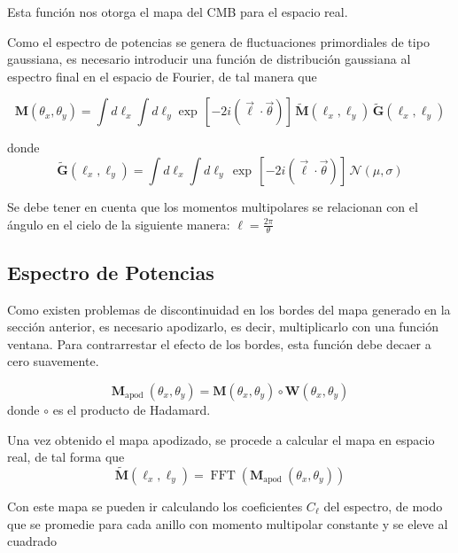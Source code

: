 \documentclass[twocolumn,letterpaper,spanish]{revtex4}
\numberwithin{equation}{section}
\begin{document}
Esta funci\'on nos otorga el mapa del CMB para el espacio real.

Como el espectro de potencias se genera de fluctuaciones primordiales de tipo gaussiana, es necesario introducir una funci\'on de distribuci\'on gaussiana al espectro final en el espacio de Fourier, de tal manera que

\begin{equation}
\mathbf{M}\left(\theta_{x}, \theta_{y}\right)=\int d \ell_{x} \int d \ell_{y} \exp \,[-2 i(\vec{\ell} \cdot \vec{\theta})] \,\tilde{\mathbf{M}}\left(\ell_{x}, \ell_{y}\right)\, \tilde{\mathbf{G}}\left(\ell_{x}, \ell_{y}\right)
\end{equation}

donde 
\begin{equation}
\tilde{\mathbf{G}}\left(\ell_{x}, \ell_{y}\right)=\int d \ell_{x} \int d \ell_{y} \,\exp\, [-2 i(\vec{\ell} \cdot \vec{\theta})] \,\mathcal{N}(\mu, \sigma)
\end{equation}

Se debe tener en cuenta que los momentos multipolares se relacionan con el \'angulo en el cielo de la siguiente manera: $\ell=\frac{2\pi}{\theta}$

\subsection{Espectro de Potencias}\label{espectro}

Como existen problemas de discontinuidad en los bordes del mapa generado en la secci\'on anterior, es necesario apodizarlo, es decir, multiplicarlo con una funci\'on ventana. Para contrarrestar el efecto de los bordes, esta funci\'on debe decaer a cero suavemente. 

\begin{equation}
\mathbf{M}_{\text {apod }}\left(\theta_{x}, \theta_{y}\right)=\mathbf{M}\left(\theta_{x}, \theta_{y}\right) \circ \mathbf{W}\left(\theta_{x}, \theta_{y}\right)
\end{equation}
donde $\circ$ es el producto de Hadamard.

Una vez obtenido el mapa apodizado, se procede a calcular el mapa en espacio real, de tal forma que
\begin{equation}
\tilde{\mathbf{M}}\left(\ell_{x}, \ell_{y}\right)=\operatorname{FFT}\left(\mathbf{M}_{\text {apod }}\left(\theta_{x}, \theta_{y}\right)\right)
\end{equation}

Con este mapa se pueden ir calculando los coeficientes $C_\ell$ del espectro, de modo que se promedie para cada anillo con momento multipolar constante y se eleve al cuadrado 
\end{document}
